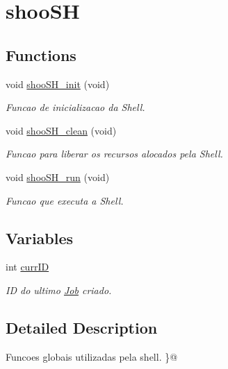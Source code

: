\hypertarget{group__shooSH}{
\section{shooSH}
\label{group__shooSH}
}
\subsection*{Functions}
\begin{DoxyCompactItemize}
\item 
\hypertarget{group__shooSH_ga195fe9c2dbe4718d8213fe2a5e2a0450}{
void \hyperlink{group__shooSH_ga195fe9c2dbe4718d8213fe2a5e2a0450}{shooSH\_\-init} (void)}
\label{group__shooSH_ga195fe9c2dbe4718d8213fe2a5e2a0450}

\begin{DoxyCompactList}\small\item\em Funcao de inicializacao da Shell. \end{DoxyCompactList}\item 
\hypertarget{group__shooSH_gac8311576ddeb5a69389e9a224a5ff9c7}{
void \hyperlink{group__shooSH_gac8311576ddeb5a69389e9a224a5ff9c7}{shooSH\_\-clean} (void)}
\label{group__shooSH_gac8311576ddeb5a69389e9a224a5ff9c7}

\begin{DoxyCompactList}\small\item\em Funcao para liberar os recursos alocados pela Shell. \end{DoxyCompactList}\item 
\hypertarget{group__shooSH_gaecd794f24791312662498f8dc1c1ae02}{
void \hyperlink{group__shooSH_gaecd794f24791312662498f8dc1c1ae02}{shooSH\_\-run} (void)}
\label{group__shooSH_gaecd794f24791312662498f8dc1c1ae02}

\begin{DoxyCompactList}\small\item\em Funcao que executa a Shell. \end{DoxyCompactList}\end{DoxyCompactItemize}
\subsection*{Variables}
\begin{DoxyCompactItemize}
\item 
\hypertarget{group__shooSH_ga188783f01b9e232bd76a7952c17dac98}{
int \hyperlink{group__shooSH_ga188783f01b9e232bd76a7952c17dac98}{currID}}
\label{group__shooSH_ga188783f01b9e232bd76a7952c17dac98}

\begin{DoxyCompactList}\small\item\em ID do ultimo \hyperlink{classJob}{Job} criado. \end{DoxyCompactList}\end{DoxyCompactItemize}


\subsection{Detailed Description}
Funcoes globais utilizadas pela shell. \}@ 
